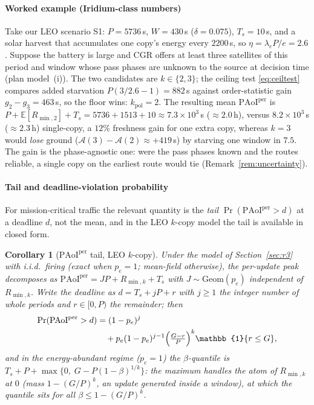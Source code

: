 \documentclass[twocolumn,3p,times,procedia]{elsarticle}
\theoremstyle{plain}
\newtheorem{corollary}{Corollary}
\theoremstyle{remark}
\newcommand{\PAoIper}{\mathrm{PAoI}^{\mathrm{per}}}
\newcommand{\E}{\mathbb{E}}
\newcommand{\ind}{\mathbb{1}}
\newcommand{\peff}{p_e}
\begin{document}



\paragraph*{Worked example (Iridium-class numbers)}
Take our LEO scenario S1: $P=5736$\,s, $W=430$\,s
($\delta=0.075$), $T_s=10$\,s, and a solar harvest that accumulates one
copy's energy every $2200$\,s, so $\eta=\lambda_e P/e=2.6$. Suppose the
battery is large and CGR offers at least three satellites of this
period and window whose pass phases are unknown to the source at
decision time (plan model~(i)). The two candidates are $k\in\{2,3\}$; the ceiling test \eqref{eq:ceiltest}
compares added starvation $P(3/2.6-1)=882$\,s against order-statistic
gain $g_2-g_3=463$\,s, so the floor wins: $k_{\mathrm{pol}}=2$. The
resulting mean $\PAoIper$ is $P+\E[R_{\min,2}]+T_s=5736+1513+10\approx
7.3\times10^3$\,s ($\approx 2.0$\,h), versus $8.2\times10^3$\,s
($\approx2.3$\,h) single-copy, a $12\%$ freshness gain for one extra
copy, whereas $k{=}3$ would \emph{lose} ground
($\mathcal{A}(3)-\mathcal{A}(2)\approx+419$\,s) by starving one window in
$7.5$. The gain is the phase-agnostic one: were the pass phases known
and the routes reliable, a single copy on the earliest route would tie
(Remark~\ref{rem:uncertainty}).

\paragraph*{Tail and deadline-violation probability}
For mission-critical traffic the relevant quantity is the
\emph{tail} $\Pr(\PAoIper>d)$ at a deadline $d$, not the mean, and in
the LEO $k$-copy model the tail is available in closed form.

\begin{corollary}[$\PAoIper$ tail, LEO $k$-copy]\label{cor:tail}
Under the model of Section~\ref{sec:r3} with i.i.d.\ firing (exact when
$\peff=1$; mean-field otherwise), the per-update peak decomposes as
$\PAoIper=JP+R_{\min,k}+T_s$ with $J\sim\mathrm{Geom}(\peff)$ independent of
$R_{\min,k}$. Write the deadline as $d=T_s+jP+r$ with $j\ge1$ the
integer number of whole periods and $r\in[0,P)$ the remainder; then
\begin{equation}\label{eq:tailcf}
\begin{aligned}
\Pr(\PAoIper>d)&=(1-\peff)^{j}\\
&\quad+\peff(1-\peff)^{j-1}\Bigl(\tfrac{G-r}{P}\Bigr)^{k}\ind\{r\le G\},
\end{aligned}
\end{equation}
and in the energy-abundant regime ($\peff{=}1$) the $\beta$-quantile is
$T_s+P+\max\bigl\{0,\;G-P(1-\beta)^{1/k}\bigr\}$: the maximum handles the
atom of $R_{\min,k}$ at $0$ (mass $1-(G/P)^k$, an update generated
inside a window), at which the quantile sits for all
$\beta\le1-(G/P)^k$.
\end{corollary}
\end{document}
